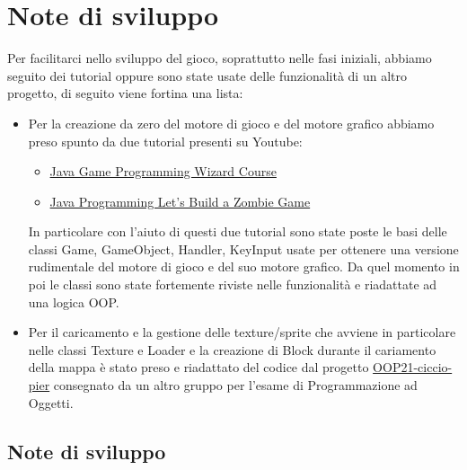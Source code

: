 \documentclass[a4paper,12pt]{report}
\begin{document}
\section{Note di sviluppo}

Per facilitarci nello sviluppo del gioco, soprattutto nelle fasi iniziali, abbiamo seguito dei tutorial oppure sono state usate delle funzionalità di un altro progetto, di seguito viene fortina una lista:
\begin{itemize}
	\item Per la creazione da zero del motore di gioco e del motore grafico abbiamo preso spunto da due tutorial presenti su Youtube: 
	 \begin{itemize}
	 	\item \href{https://www.youtube.com/playlist?list=PLWms45O3n--5vDnNd6aiu1CSWX3JlCU1n}{Java Game Programming Wizard Course}
	 	\item \href{https://www.youtube.com/playlist?list=PLWms45O3n--5vv69_AlMw23O1Z31CaW1F}{Java Programming Let's Build a Zombie Game}
	 \end{itemize}
	 In particolare con l'aiuto di questi due tutorial sono state poste le basi delle classi Game, GameObject, Handler, KeyInput usate per ottenere una versione rudimentale del motore di gioco e del suo motore grafico.
	 Da quel momento in poi le classi sono state fortemente riviste nelle funzionalità e riadattate ad una logica OOP.
	 
	 \item Per il caricamento e la gestione delle texture/sprite che avviene in particolare nelle classi Texture e Loader e la creazione di Block durante il cariamento della mappa è stato preso e riadattato del codice dal progetto 
	 \href{https://github.com/Valdi1111/OOP21-ciccio-pier}{OOP21-ciccio-pier} consegnato da un altro gruppo per l'esame di Programmazione ad Oggetti.
	 
\end{itemize}

\paragraph{}

\subsection{Note di sviluppo}
\end{document}
